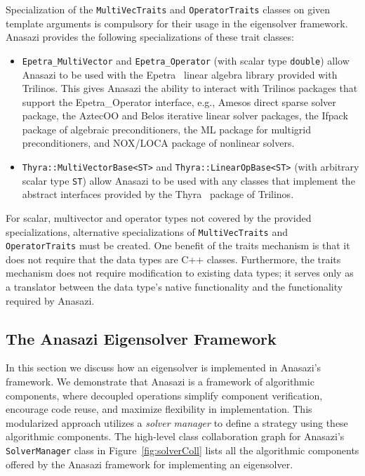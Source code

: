 \documentclass[acmtoms,acmnow]{acmtrans2m}
\newcommand{\aspace}[1]{\texttt{#1}}
\begin{document}
Specialization of the \aspace{MultiVecTraits} and \aspace{OperatorTraits} classes on
given template arguments is compulsory for their usage in the eigensolver framework.
Anasazi provides the following specializations of these trait classes:
\begin{itemize}
  \item \aspace{Epetra\_MultiVector} and \aspace{Epetra\_Operator} (with scalar type
    \aspace{double}) allow Anasazi to be used with the Epetra~\cite{Trilinos:Epetra} linear
    algebra library provided with Trilinos. This gives Anasazi the ability to interact with 
    Trilinos packages that support the Epetra\_Operator interface, e.g., Amesos direct
    sparse solver package, the AztecOO and Belos iterative linear solver packages, 
    the Ifpack package of algebraic preconditioners, the ML package for multigrid
    preconditioners, and NOX/LOCA package of nonlinear solvers. 
  \item \aspace{Thyra::MultiVectorBase<ST>} and
    \aspace{Thyra::LinearOpBase<ST>} (with arbitrary scalar type
    \aspace{ST}) allow Anasazi to be used with any classes that implement the abstract interfaces
    provided by the Thyra~\cite{Trilinos:Thyra} package of Trilinos.
\end{itemize}
For scalar, multivector and operator types not covered by the provided specializations,
alternative specializations of \aspace{MultiVecTraits} and \aspace{OperatorTraits}
must be created. One benefit of the traits mechanism is that it does
not require that the data types are C++ classes. Furthermore, the traits mechanism
does not require modification to existing data types; it serves only as a translator between
the data type's native functionality and the functionality required by Anasazi.


\subsection{The Anasazi Eigensolver Framework}
\label{subsec:anasazi:solver_framework}

In this section we discuss how an eigensolver is implemented in Anasazi's framework. We
demonstrate that Anasazi is a framework of algorithmic components, where decoupled
operations simplify component verification, encourage code reuse, and maximize flexibility
in implementation. This modularized approach utilizes a \emph{solver manager} to define a
strategy using these algorithmic components. The high-level class collaboration graph for
Anasazi's \aspace{SolverManager} class in Figure~\ref{fig:solverColl} lists all the
algorithmic components offered by the Anasazi framework for implementing an eigensolver.
\end{document}
